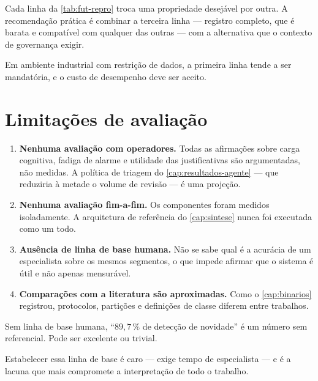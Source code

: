 \begin{destaque}
Cada linha da \cref{tab:fut-repro} troca uma propriedade desejável por outra. A
recomendação prática é combinar a terceira linha --- registro completo, que é barata e
compatível com qualquer das outras --- com a alternativa que o contexto de governança
exigir.

Em ambiente industrial com restrição de dados, a primeira linha tende a ser mandatória,
e o custo de desempenho deve ser aceito.
\end{destaque}

\section{Limitações de avaliação}

\begin{enumerate}[leftmargin=*,itemsep=0.4em]

\item \textbf{Nenhuma avaliação com operadores.} Todas as afirmações sobre carga
cognitiva, fadiga de alarme e utilidade das justificativas são argumentadas, não medidas.
A política de triagem do \cref{cap:resultados-agente} --- que reduziria à metade o volume
de revisão --- é uma projeção.

\item \textbf{Nenhuma avaliação fim-a-fim.} Os componentes foram medidos isoladamente. A
arquitetura de referência do \cref{cap:sintese} nunca foi executada como um todo.

\item \textbf{Ausência de linha de base humana.} Não se sabe qual é a acurácia de um
especialista sobre os mesmos segmentos, o que impede afirmar que o sistema é útil e não
apenas mensurável.

\item \textbf{Comparações com a literatura são aproximadas.} Como o \cref{cap:binarios}
registrou, protocolos, partições e definições de classe diferem entre trabalhos.

\end{enumerate}

\begin{destaque}
Sem linha de base humana, ``$89{,}7\,\%$ de detecção de novidade'' é um número sem
referencial. Pode ser excelente ou trivial.

Estabelecer essa linha de base é caro --- exige tempo de especialista --- e é a lacuna
que mais compromete a interpretação de todo o trabalho.
\end{destaque}

